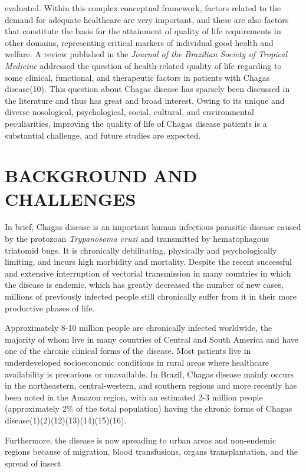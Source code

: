  evaluated. Within this complex conceptual framework, factors related to the demand for
 adequate healthcare are very important, and these are also factors that constitute the
 basis for the attainment of quality of life requirements in other domains, representing
 critical markers of individual good health and welfare. A review published in the
 \textit{Journal of the Brazilian Society of Tropical Medicine} addressed the
 question of health-related quality of life regarding to some clinical, functional, and
 therapeutic factors in patients with Chagas disease(10). This question about Chagas disease has sparsely been discussed in the
 literature and thus has great and broad interest. Owing to its unique and diverse
 nosological, psychological, social, cultural, and environmental peculiarities, improving
 the quality of life of Chagas disease patients is a substantial challenge, and future
 studies are expected. \section*{BACKGROUND AND CHALLENGES}\par In brief, Chagas disease is an important human infectious parasitic disease caused by
 the protozoan \textit{Trypanosoma cruzi} and transmitted by hematophagous
 triatomid bugs. It is chronically debilitating, physically and psychologically limiting,
 and incurs high morbidity and mortality. Despite the recent successful and extensive
 interruption of vectorial transmission in many countries in which the disease is
 endemic, which has greatly decreased the number of new cases, millions of previously
 infected people still chronically suffer from it in their more productive phases of
 life. \par Approximately 8-10 million people are chronically infected worldwide, the majority of
 whom live in many countries of Central and South America and have one of the chronic
 clinical forms of the disease. Most patients live in underdeveloped socioeconomic
 conditions in rural areas where healthcare availability is precarious or unavailable. In
 Brazil, Chagas disease mainly occurs in the northeastern, central-western, and southern
 regions and more recently has been noted in the Amazon region, with an estimated 2-3
 million people (approximately 2\% of the total population) having the chronic forms of
 Chagas disease(1)(2)(12)(13)(14)(15)(16).\par Furthermore, the disease is now spreading to urban areas and non-endemic regions because
 of migration, blood transfusions, organs transplantation, and the spread of insect
